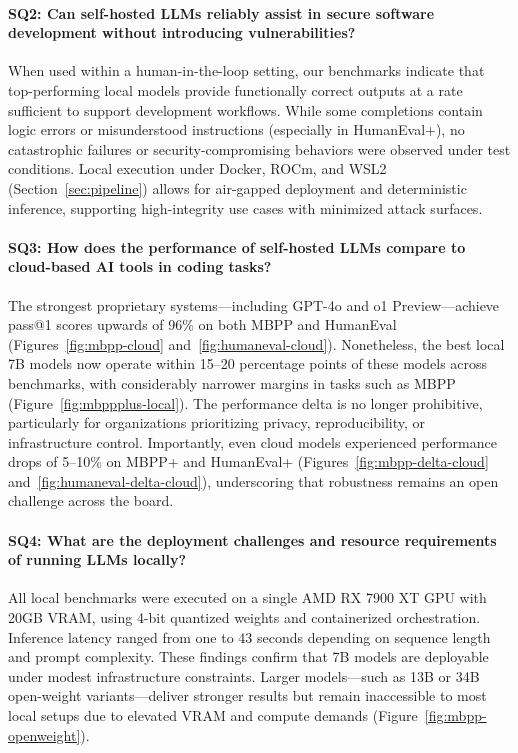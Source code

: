\paragraph{SQ2: Can self-hosted LLMs reliably assist in secure software development without introducing vulnerabilities?}
When used within a human-in-the-loop setting, our benchmarks indicate that top-performing local models provide functionally correct outputs at a rate sufficient to support development workflows. While some completions contain logic errors or misunderstood instructions (especially in HumanEval+), no catastrophic failures or security-compromising behaviors were observed under test conditions. Local execution under Docker, ROCm, and WSL2 (Section~\ref{sec:pipeline}) allows for air-gapped deployment and deterministic inference, supporting high-integrity use cases with minimized attack surfaces.

\paragraph{SQ3: How does the performance of self-hosted LLMs compare to cloud-based AI tools in coding tasks?}
The strongest proprietary systems—including GPT-4o and o1 Preview—achieve pass@1 scores upwards of 96\% on both MBPP and HumanEval (Figures~\ref{fig:mbpp-cloud} and~\ref{fig:humaneval-cloud}). Nonetheless, the best local 7B models now operate within 15--20 percentage points of these models across benchmarks, with considerably narrower margins in tasks such as MBPP (Figure~\ref{fig:mbppplus-local}). The performance delta is no longer prohibitive, particularly for organizations prioritizing privacy, reproducibility, or infrastructure control. Importantly, even cloud models experienced performance drops of 5--10\% on MBPP+ and HumanEval+ (Figures~\ref{fig:mbpp-delta-cloud} and~\ref{fig:humaneval-delta-cloud}), underscoring that robustness remains an open challenge across the board.

\paragraph{SQ4: What are the deployment challenges and resource requirements of running LLMs locally?}
All local benchmarks were executed on a single AMD RX 7900 XT GPU with 20GB VRAM, using 4-bit quantized weights and containerized orchestration. Inference latency ranged from one to 43 seconds depending on sequence length and prompt complexity. These findings confirm that 7B models are deployable under modest infrastructure constraints. Larger models—such as 13B or 34B open-weight variants—deliver stronger results but remain inaccessible to most local setups due to elevated VRAM and compute demands (Figure~\ref{fig:mbpp-openweight}).

